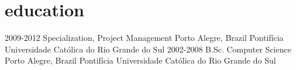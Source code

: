 \section{education}

\begin{entrylist}
  \entry
    {2009-2012}
    {Specialization, Project Management}
    {Porto Alegre, Brazil}
    {Pontifícia Universidade Católica do Rio Grande do Sul}
  \entry
    {2002-2008}
    {B.Sc. Computer Science}
    {Porto Alegre, Brazil}
    {Pontifícia Universidade Católica do Rio Grande do Sul}
\end{entrylist}